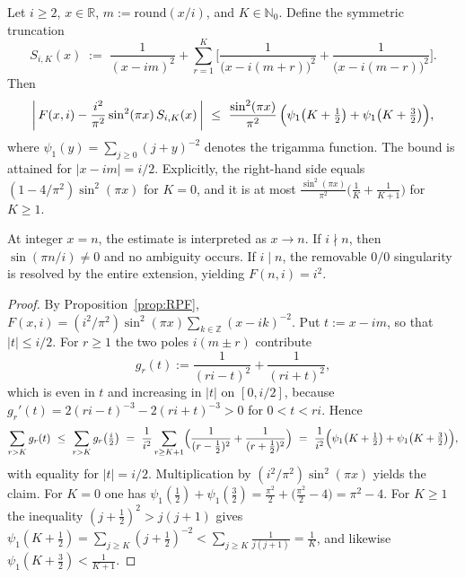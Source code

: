 \begin{theorem}\label{thm:RPF-trunc}
Let $i\ge 2$, $x\in\mathbb{R}$, $m:=\mathrm{round}(x/i)$, and $K\in\mathbb{N}_0$. Define the symmetric truncation
\[
S_{i,K}(x)\;:=\;\frac{1}{(x-i m)^{2}}+\sum_{r=1}^{K}\Biggl[\frac{1}{\bigl(x-i(m+r)\bigr)^{2}}+\frac{1}{\bigl(x-i(m-r)\bigr)^{2}}\Biggr].
\]
Then
\[
\left|\,F(x,i)-\frac{i^{2}}{\pi^{2}}\sin^{2}(\pi x)\,S_{i,K}(x)\,\right|
\ \le\ \frac{\sin^{2}(\pi x)}{\pi^{2}}\,\Bigl(\psi_1\bigl(K+\tfrac12\bigr)+\psi_1\bigl(K+\tfrac32\bigr)\Bigr),
\]
where $\psi_1(y)=\sum_{j\ge0}(j+y)^{-2}$ denotes the trigamma function. The bound is attained for $|x-im|=i/2$. Explicitly, the right-hand side equals $(1-4/\pi^{2})\sin^{2}(\pi x)$ for $K=0$, and it is at most $\frac{\sin^{2}(\pi x)}{\pi^{2}}\bigl(\frac1K+\frac1{K+1}\bigr)$ for $K\ge1$.
\end{theorem}

\begin{remark}
At integer $x=n$, the estimate is interpreted as $x\to n$. If $i\nmid n$, then $\sin(\pi n/i)\neq 0$ and no ambiguity occurs. If $i\mid n$, the removable $0/0$ singularity is resolved by the entire extension, yielding $F(n,i)=i^2$.
\end{remark}

\begin{proof}
By Proposition~\ref{prop:RPF}, $F(x,i)=(i^{2}/\pi^{2})\sin^{2}(\pi x)\sum_{k\in\mathbb{Z}}(x-ik)^{-2}$. Put $t:=x-im$, so that $|t|\le i/2$. For $r\ge1$ the two poles $i(m\pm r)$ contribute
\[
g_r(t):=\frac{1}{(ri-t)^{2}}+\frac{1}{(ri+t)^{2}},
\]
which is even in $t$ and increasing in $|t|$ on $[0,i/2]$, because $g_r'(t)=2(ri-t)^{-3}-2(ri+t)^{-3}>0$ for $0<t<ri$. Hence
\[
\sum_{r>K}g_r(t)\ \le\ \sum_{r>K}g_r\bigl(\tfrac i2\bigr)
\ =\ \frac{1}{i^{2}}\sum_{r\ge K+1}\Bigl(\frac{1}{(r-\frac12)^{2}}+\frac{1}{(r+\frac12)^{2}}\Bigr)
\ =\ \frac{1}{i^{2}}\Bigl(\psi_1\bigl(K+\tfrac12\bigr)+\psi_1\bigl(K+\tfrac32\bigr)\Bigr),
\]
with equality for $|t|=i/2$. Multiplication by $(i^{2}/\pi^{2})\sin^{2}(\pi x)$ yields the claim. For $K=0$ one has $\psi_1(\tfrac12)+\psi_1(\tfrac32)=\tfrac{\pi^2}{2}+\bigl(\tfrac{\pi^2}{2}-4\bigr)=\pi^2-4$. For $K\ge1$ the inequality $(j+\tfrac12)^2>j(j+1)$ gives $\psi_1(K+\tfrac12)=\sum_{j\ge K}(j+\tfrac12)^{-2}<\sum_{j\ge K}\frac{1}{j(j+1)}=\frac1K$, and likewise $\psi_1(K+\tfrac32)<\frac1{K+1}$.
\end{proof}

